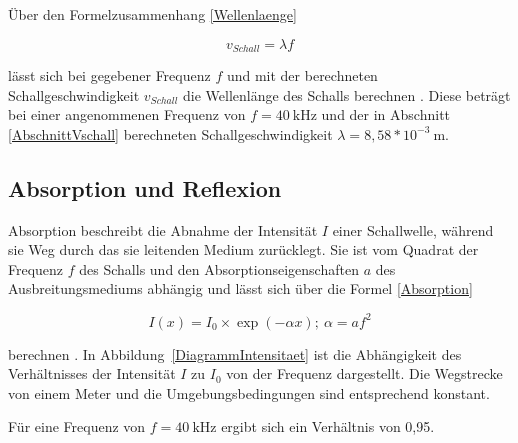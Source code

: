 Über den Formelzusammenhang \ref{Wellenlaenge}

\begin{equation}
    v_{Schall}=\lambda f
    \label{Wellenlaenge}
\end{equation}

lässt sich bei gegebener Frequenz $f$ und mit der berechneten Schallgeschwindigkeit $v_{Schall}$ die Wellenlänge des Schalls berechnen \cite{Willems:2022}. Diese beträgt bei einer angenommenen Frequenz von $f=40 \:\text{kHz}$ und der in Abschnitt \ref{AbschnittVschall} berechneten Schallgeschwindigkeit $\lambda=8{,}58*10^{-3} \:\text{m}$.

\subsection{Absorption und Reflexion}

Absorption beschreibt die Abnahme der Intensität $I$ einer Schallwelle, während sie Weg durch das sie leitenden Medium zurücklegt. Sie ist vom Quadrat der Frequenz $f$ des Schalls und den Absorptionseigenschaften $a$ des Ausbreitungsmediums abhängig und lässt sich über die Formel \ref{Absorption}

\begin{equation}
    I(x)=I_0\times\exp(-\alpha x); \:\alpha=af^2
    \label{Absorption}
\end{equation}

berechnen \cite{Hering:2023,Hering:2021b}.
In Abbildung~\ref{DiagrammIntensitaet} ist die Abhängigkeit des Verhältnisses der Intensität $I$ zu $I_0$ von der Frequenz dargestellt. Die Wegstrecke von einem Meter und die Umgebungsbedingungen sind entsprechend konstant.

Für eine Frequenz von $f=40 \:\text{kHz}$ ergibt sich ein Verhältnis von 0,95.

